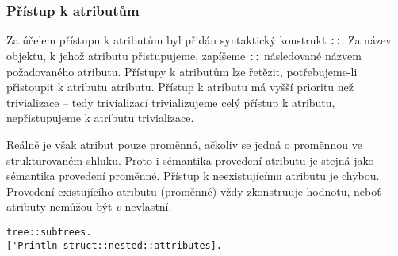 \subsubsection{Přístup k atributům}

Za účelem přístupu k atributům byl přidán syntaktický konstrukt \lstinline{::}. Za název objektu,
k jehož atributu přistupujeme, zapíšeme \lstinline{::} následované názvem požadovaného atributu.
Přístupy k atributům lze řetězit, potřebujeme-li přistoupit k atributu atributu. Přístup k atributu
má vyšší prioritu než trivializace -- tedy trivializací trivializujeme celý přístup k atributu,
nepřistupujeme k atributu trivializace.

Reálně je však atribut pouze proměnná, ačkoliv se jedná o proměnnou ve strukturovaném shluku.
Proto i sémantika provedení atributu je stejná jako sémantika provedení proměnné. Přístup
k neexistujícímu atributu je chybou. Provedení existujícího atributu (proměnné) vždy zkonstruuje
hodnotu, neboť atributy nemůžou být $v$-nevlastní.

\begin{lstlisting}[caption={Příklad přístupu k atributům objektu}]
tree::subtrees.
['Println struct::nested::attributes].
\end{lstlisting}

\endinput
